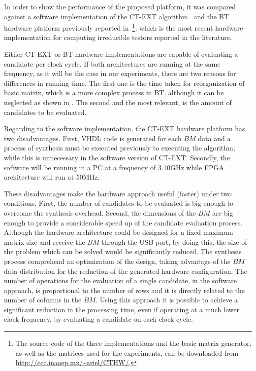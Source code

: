 \documentclass[authoryear,preprint,review,12pt]{elsarticle}
\begin{document}
In order to show the performance of the proposed platform, it was compared against a software 
implementation of the CT-EXT algorithm~\citep{R22} and the BT hardware platform previously 
reported in~\citep{Rod14}\footnote{The source code of the three implementations and the basic matrix
generator, as well as the matrices used for the experiments, can be downloaded from 
\url{http://ccc.inaoep.mx/~ariel/CTHW/}.}; which is the most recent hardware implementation for computing irreducible testors reported in the literature.
 

Either CT-EXT or BT hardware implementations are capable of evaluating a candidate per clock 
cycle. If both architectures are running at the same frequency, as it will be the case in our experiments, 
there are two reasons for differences in running time. The first one is the time taken for reorganization 
of basic matrix, which is a more complex process in BT, although it can be neglected as shown in \citep{R21}. 
The second and the most relevant, is the amount of candidates to be evaluated. 

Regarding to the software implementation, the CT-EXT hardware platform has two disadvantages. First, 
VHDL code is generated for each $BM$ data and a process of synthesis must be executed previously to 
executing the algorithm; while this is unnecessary in the software version of CT-EXT. Secondly, the 
software will be running in a PC at a frequency of 3.10GHz while FPGA architecture will run at 50MHz. 

These disadvantages make the hardware approach useful (faster) under two conditions. First, the number of 
candidates to be evaluated is big enough to overcome the synthesis overhead. Second, the dimensions of the 
$BM$ are big enough to provide a considerable speed up of the candidate evaluation process. Although 
the hardware architecture could be designed for a fixed maximum matrix size and receive the $BM$ through the 
USB port, by doing this, the size of the problem which can be solved would be significantly reduced. The 
synthesis process comprehend an optimization of the design, taking advantage of the $BM$ data distribution for 
the reduction of the generated hardware configuration. The number of operations for the evaluation of a single 
candidate, in the software approach, is proportional to the number of rows and it is directly related to the 
number of columns in the $BM$. Using this approach it is possible to achieve a significant reduction in the processing time, even if
operating at a much lower clock frequency, by evaluating a candidate on each clock cycle.
\end{document}
